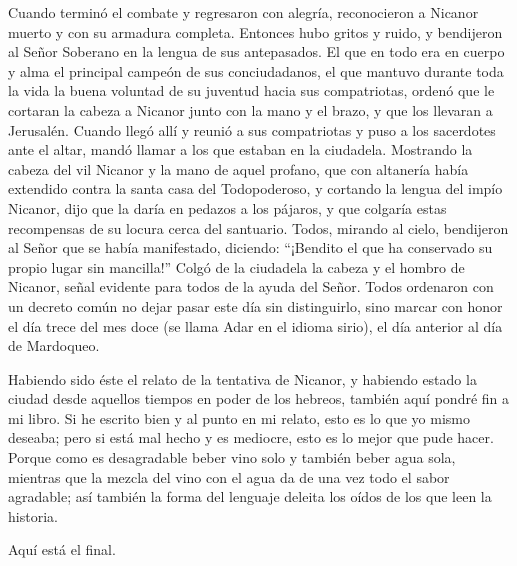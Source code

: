  Cuando terminó el combate y regresaron con alegría,
reconocieron a Nicanor muerto y con su armadura completa.
 Entonces hubo gritos y ruido, y bendijeron al Señor
Soberano en la lengua de sus antepasados.  El que en todo
era en cuerpo y alma el principal campeón de sus conciudadanos, el que
mantuvo durante toda la vida la buena voluntad de su juventud hacia sus
compatriotas, ordenó que le cortaran la cabeza a Nicanor junto con la
mano y el brazo, y que los llevaran a Jerusalén.  Cuando
llegó allí y reunió a sus compatriotas y puso a los sacerdotes ante el
altar, mandó llamar a los que estaban en la ciudadela. 
Mostrando la cabeza del vil Nicanor y la mano de aquel profano, que con
altanería había extendido contra la santa casa del Todopoderoso,
 y cortando la lengua del impío Nicanor, dijo que la
daría en pedazos a los pájaros, y que colgaría estas recompensas de su
locura cerca del santuario.  Todos, mirando al cielo,
bendijeron al Señor que se había manifestado, diciendo: ``¡Bendito el
que ha conservado su propio lugar sin mancilla!''  Colgó
de la ciudadela la cabeza y el hombro de Nicanor, señal evidente para
todos de la ayuda del Señor.  Todos ordenaron con un
decreto común no dejar pasar este día sin distinguirlo, sino marcar con
honor el día trece del mes doce (se llama Adar en el idioma sirio), el
día anterior al día de Mardoqueo.

 Habiendo sido éste el relato de la tentativa de Nicanor,
y habiendo estado la ciudad desde aquellos tiempos en poder de los
hebreos, también aquí pondré fin a mi libro.  Si he
escrito bien y al punto en mi relato, esto es lo que yo mismo deseaba;
pero si está mal hecho y es mediocre, esto es lo mejor que pude hacer.
 Porque como es desagradable beber vino solo y también
beber agua sola, mientras que la mezcla del vino con el agua da de una
vez todo el sabor agradable; así también la forma del lenguaje deleita
los oídos de los que leen la historia.

Aquí está el final.
